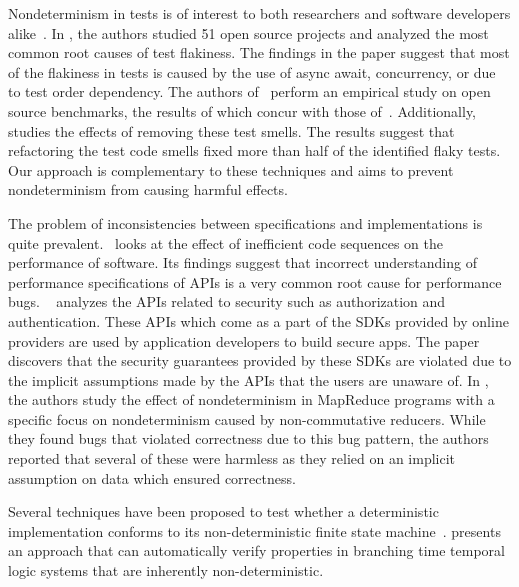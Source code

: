 Nondeterminism in tests is of interest to both
researchers and software developers alike~\cite{Fowler,Sudarshan}.
In \cite{LuoHEM2014}, the authors studied 51 open source projects and analyzed the most common root causes of
test flakiness. The findings in the paper suggest that most of the flakiness in tests is caused by
the use of async await, concurrency, or due to test order dependency. The authors of~\cite{Plotkin:1993:LPP:645891.671433}
perform an empirical study on open source benchmarks, the results of which concur with those of~\cite{LuoHEM2014}.
Additionally,~\cite{Plotkin:1993:LPP:645891.671433} studies the effects of removing these test smells. The results suggest that
refactoring the test code smells fixed more than half of the identified flaky tests. Our approach is complementary to
these techniques and aims to prevent nondeterminism from causing harmful effects. 

The problem of inconsistencies between specifications and implementations
is quite prevalent.~\cite{Jin:2012:UDR:2254064.2254075} looks at the effect of inefficient code sequences on the performance of software.
Its findings suggest that incorrect understanding of performance specifications of APIs is a very common root cause for
performance bugs. ~\cite{Rui:2013:180377} analyzes the APIs related to security such as authorization and authentication.
These APIs which come as a part of the SDKs provided by online providers are used by application developers to 
build secure apps. The paper discovers that the security guarantees provided by these SDKs are violated due to
the implicit assumptions made by the APIs that the users are unaware of. In \cite{Xiao:2014:NMC:2591062.2591177},
the authors
study the effect of nondeterminism in MapReduce programs with a specific focus on nondeterminism caused by
non-commutative reducers. While they found bugs that violated correctness due to this bug pattern,
the authors reported that several of these were harmless as they relied on an implicit assumption on data
which ensured correctness. 

Several techniques have been proposed to test whether a
deterministic implementation conforms to its non-deterministic finite state machine~\cite{Petrenko1996,Petrenko:1993:NSM:648128.761244,Savor:1997:639710,Hierons:2004:TCD:1040993.1040998}.
\cite{Cook:2013:RNP:2491956.2491969} presents an approach that can automatically verify properties
in branching time temporal logic systems that are inherently non-deterministic.

